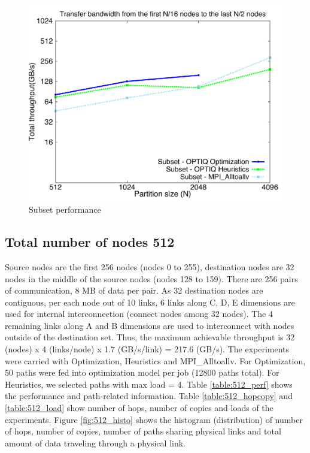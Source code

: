 \documentclass[letter]{article}
\begin{document}
\begin{figure}[!htb]
\vspace{-0.1in}
\centering
\includegraphics[scale=0.30]{report_figures/constantr_subset.pdf}
\vspace{-0.1in}
\caption{Subset performance}
\vspace{-0.1in}
\label{fig:patterns}
\end{figure}

\subsection {Total number of nodes 512}

Source nodes are the first 256 nodes (nodes 0 to 255), destination nodes are 32 nodes in the middle of the source nodes (nodes 128 to 159). There are 256 pairs of communication, 8 MB of data per pair. As 32 destination nodes are contiguous, per each node out of 10 links, 6 links along C, D, E dimensions are used for internal interconnection (connect nodes among 32 nodes). The 4 remaining links along A and B dimensions are used to interconnect with nodes outside of the destination set. Thus, the maximum achievable throughput is 32 (nodes) x 4 (links/node) x 1.7 (GB/s/link) = 217.6 (GB/s). The experiments were carried with Optimization, Heuristics and MPI\_Alltoallv. For Optimization, 50 paths were fed into optimization model per job (12800 paths total). For Heuristics, we selected paths with max load = 4. Table \ref{table:512_perf} shows the performance and path-related information. Table \ref{table:512_hopcopy} and \ref{table:512_load} show number of hops, number of copies and loads of the experiments. Figure \ref{fig:512_histo} shows the histogram (distribution) of number of hops, number of copies, number of paths sharing physical links and total amount of data traveling through a physical link.
\end{document}
